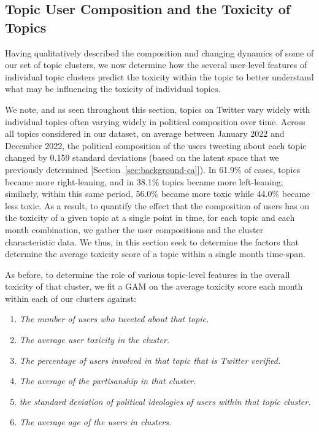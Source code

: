\subsection{Topic User Composition and the Toxicity of Topics\label{sec:topic-level-gam}} Having qualitatively described the composition and changing dynamics of some of our set of topic clusters, we now determine how the several user-level features of individual topic clusters predict the toxicity within the topic to better understand what may be influencing the toxicity of individual topics.

We note, and as seen throughout this section, topics on Twitter vary widely with individual topics often varying widely in political composition over time. Across all topics considered in our dataset, on average between January 2022 and December 2022, the political composition of the users tweeting about each topic changed by 0.159 standard deviations (based on the latent space that we previously determined [Section~\ref{sec:background-ca}]). In 61.9\% of cases, topics became more right-leaning, and in 38.1\%  topics became more left-leaning; similarly, within this same period, 56.0\% became more toxic while 44.0\% became less toxic. As a result, to quantify the effect that the composition of users has on the toxicity of a given topic at a single point in time, for each topic and each month combination, we gather the user compositions and the cluster characteristic data. We thus, in this section seek to determine the factors that determine the average toxicity score of a topic within a single month time-span. 

As before, to determine the role of various topic-level features in the overall toxicity of that cluster, we fit a GAM on the average toxicity score each month within each of our clusters against: \begin{enumerate}
    \item \emph{The number of users who tweeted about that topic.}
    \item \emph{The average user toxicity in the cluster.}
    \item \emph{The percentage of users involved in that topic that is Twitter verified.}
    \item \emph{The average of the partisanship in that cluster.}
    \item \emph{the standard deviation of political ideologies of users within that topic cluster.}
    \item \emph{The average age of the users in clusters.}
\end{enumerate}

